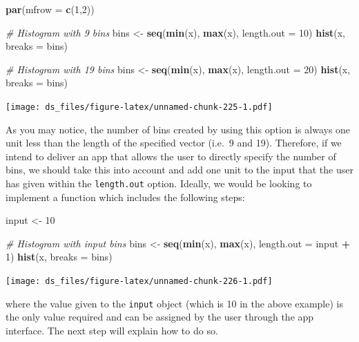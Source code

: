 \documentclass[12pt,]{krantz}
\newenvironment{Shaded}{\begin{snugshade}}{\end{snugshade}}
\newcommand{\KeywordTok}[1]{\textcolor[rgb]{0.27,0.27,0.27}{\textbf{#1}}}
\newcommand{\DataTypeTok}[1]{\textcolor[rgb]{0.27,0.27,0.27}{#1}}
\newcommand{\DecValTok}[1]{\textcolor[rgb]{0.06,0.06,0.06}{#1}}
\newcommand{\StringTok}[1]{\textcolor[rgb]{0.5,0.5,0.5}{#1}}
\newcommand{\CommentTok}[1]{\textcolor[rgb]{0.37,0.37,0.37}{\textit{#1}}}
\newcommand{\OperatorTok}[1]{\textcolor[rgb]{0.43,0.43,0.43}{\textbf{#1}}}
\newcommand{\NormalTok}[1]{#1}
\begin{document}
\begin{Shaded}
\begin{Highlighting}[]
\KeywordTok{par}\NormalTok{(}\DataTypeTok{mfrow =} \KeywordTok{c}\NormalTok{(}\DecValTok{1}\NormalTok{,}\DecValTok{2}\NormalTok{))}

\CommentTok{# Histogram with 9 bins}
\NormalTok{bins <-}\StringTok{ }\KeywordTok{seq}\NormalTok{(}\KeywordTok{min}\NormalTok{(x), }\KeywordTok{max}\NormalTok{(x), }\DataTypeTok{length.out =} \DecValTok{10}\NormalTok{)}
\KeywordTok{hist}\NormalTok{(x, }\DataTypeTok{breaks =}\NormalTok{ bins)}

\CommentTok{# Histogram with 19 bins}
\NormalTok{bins <-}\StringTok{ }\KeywordTok{seq}\NormalTok{(}\KeywordTok{min}\NormalTok{(x), }\KeywordTok{max}\NormalTok{(x), }\DataTypeTok{length.out =} \DecValTok{20}\NormalTok{)}
\KeywordTok{hist}\NormalTok{(x, }\DataTypeTok{breaks =}\NormalTok{ bins)}
\end{Highlighting}
\end{Shaded}

\texttt{[image: ds\_files/figure-latex/unnamed-chunk-225-1.pdf]}

As you may notice, the number of bins created by using this option is
always one unit less than the length of the specified vector (i.e.~9 and
19). Therefore, if we intend to deliver an app that allows the user to
directly specify the number of bins, we should take this into account
and add one unit to the input that the user has given within the
\texttt{length.out} option. Ideally, we would be looking to implement a
function which includes the following steps:

\begin{Shaded}
\begin{Highlighting}[]
\NormalTok{input <-}\StringTok{ }\DecValTok{10}

\CommentTok{# Histogram with input bins}
\NormalTok{bins <-}\StringTok{ }\KeywordTok{seq}\NormalTok{(}\KeywordTok{min}\NormalTok{(x), }\KeywordTok{max}\NormalTok{(x), }\DataTypeTok{length.out =}\NormalTok{ input }\OperatorTok{+}\StringTok{ }\DecValTok{1}\NormalTok{)}
\KeywordTok{hist}\NormalTok{(x, }\DataTypeTok{breaks =}\NormalTok{ bins)}
\end{Highlighting}
\end{Shaded}

\texttt{[image: ds\_files/figure-latex/unnamed-chunk-226-1.pdf]}

where the value given to the \texttt{input} object (which is 10 in the
above example) is the only value required and can be assigned by the
user through the app interface. The next step will explain how to do so.
\end{document}
